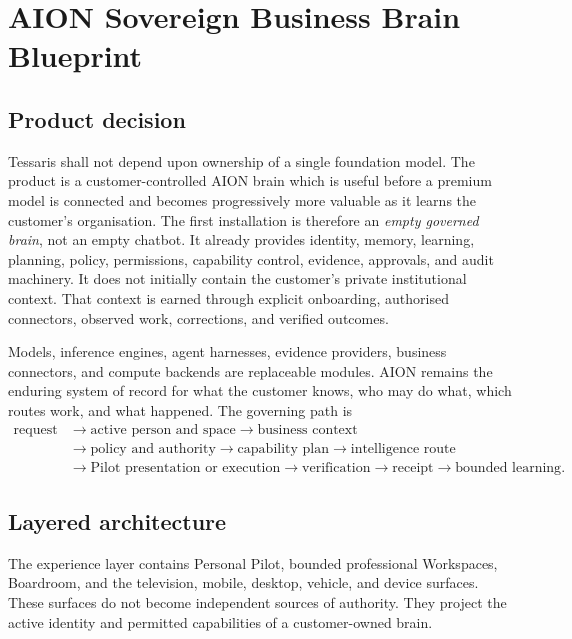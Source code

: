 \section{AION Sovereign Business Brain Blueprint}
\label{sec:aion-sovereign-business-brain}

\subsection{Product decision}

Tessaris shall not depend upon ownership of a single foundation model.  The
product is a customer-controlled AION brain which is useful before a premium
model is connected and becomes progressively more valuable as it learns the
customer's organisation.  The first installation is therefore an
\emph{empty governed brain}, not an empty chatbot.  It already provides
identity, memory, learning, planning, policy, permissions, capability control,
evidence, approvals, and audit machinery.  It does not initially contain the
customer's private institutional context.  That context is earned through
explicit onboarding, authorised connectors, observed work, corrections, and
verified outcomes.

Models, inference engines, agent harnesses, evidence providers, business
connectors, and compute backends are replaceable modules.  AION remains the
enduring system of record for what the customer knows, who may do what, which
routes work, and what happened.  The governing path is
\[
\begin{split}
\text{request} &\rightarrow \text{active person and space}
\rightarrow \text{business context} \\
&\rightarrow \text{policy and authority}
\rightarrow \text{capability plan}
\rightarrow \text{intelligence route} \\
&\rightarrow \text{Pilot presentation or execution}
\rightarrow \text{verification}
\rightarrow \text{receipt}
\rightarrow \text{bounded learning}.
\end{split}
\]

\subsection{Layered architecture}

The experience layer contains Personal Pilot, bounded professional Workspaces,
Boardroom, and the television, mobile, desktop, vehicle, and device surfaces.
These surfaces do not become independent sources of authority.  They project
the active identity and permitted capabilities of a customer-owned brain.

